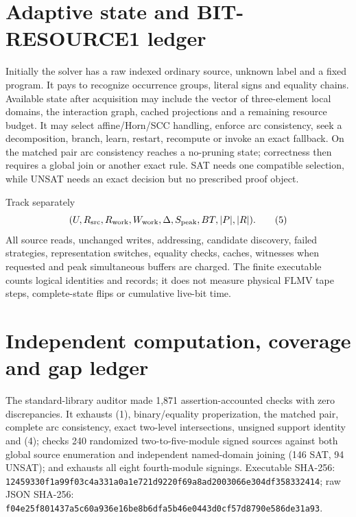 \documentclass[11pt]{article}
\begin{document}
\section{Adaptive state and BIT-RESOURCE1 ledger}
Initially the solver has a raw indexed ordinary source, unknown label and a
fixed program.  It pays to recognize occurrence groups, literal signs and
equality chains.  Available state after acquisition may include the vector of
three-element local domains, the interaction graph, cached projections and a
remaining resource budget.  It may select affine/Horn/SCC handling, enforce
arc consistency, seek a decomposition, branch, learn, restart, recompute or
invoke an exact fallback.  On the matched pair arc consistency reaches a
no-pruning state; correctness then requires a global join or another exact
rule.  SAT needs one compatible selection, while UNSAT needs an exact
decision but no prescribed proof object.

Track separately
\[
 (U,R_{\rm src},R_{\rm work},W_{\rm work},\Delta,S_{\rm peak},
 BT,|P|,|R|).                                                       \tag{5}
\]
All source reads, unchanged writes, addressing, candidate discovery, failed
strategies, representation switches, equality checks, caches, witnesses when
requested and peak simultaneous buffers are charged.  The finite executable
counts logical identities and records; it does not measure physical FLMV tape
steps, complete-state flips or cumulative live-bit time.

\section{Independent computation, coverage and gap ledger}
The standard-library auditor made 1,871 assertion-accounted checks with zero
discrepancies.  It exhausts (1), binary/equality properization, the matched
pair, complete arc consistency, exact two-level intersections, unsigned
support identity and (4); checks 240 randomized two-to-five-module signed
sources against both global source enumeration and independent named-domain
joining (146 SAT, 94 UNSAT); and exhausts all eight fourth-module signings.
Executable SHA-256:
\texttt{12459330f1a99f03c4a331a0a1e721d9220f69a8ad2003066e304df358332414};
raw JSON SHA-256:
\texttt{f04e25f801437a5c60a936e16be8b6dfa5b46e0443d0cf57d8790e586de31a93}.
\end{document}
